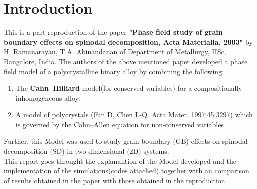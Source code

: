 \chapter{Introduction}

This is a part reproduction of the paper \textbf{"Phase field study of grain boundary effects on spinodal decomposition, Acta Materialia, 2003"}  by H. Ramanarayan, T.A. Abinandanan of Department of Metallurgy, IISc, Bangalore, India.
The authors of the above mentioned paper developed a phase field model of a polycrystalline binary alloy by combining the following:
\begin{enumerate}
\item The \textbf{Cahn–Hilliard} model(for conserved variables) for a compositionally inhomogeneous alloy.
\item A model of polycrystals (Fan D, Chen L-Q. Acta Mater. 1997;45:3297) which is governed by the Cahn–Allen equation for non-conserved variables 
 \end{enumerate} 

Further, this Model was used to study grain boundary (GB) effects on spinodal decomposition (SD) in two-dimensional (2D) systems. \\
This report goes throught the explanantion of the Model developed and the implementation of the simulations(codes attached) together with an comparison of results obtained in the paper with those obtained in the reproduction.


